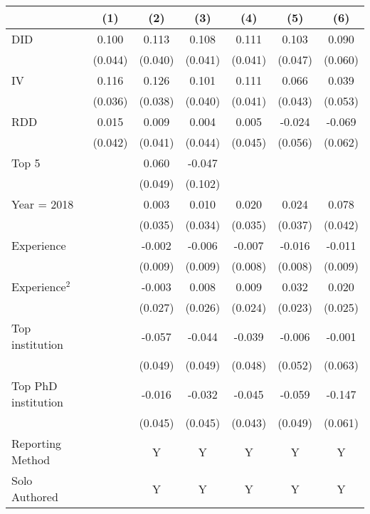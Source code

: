 \begin{tabular}{l*{6}{c}}
\hline\hline
                &\multicolumn{1}{c}{(1)}&\multicolumn{1}{c}{(2)}&\multicolumn{1}{c}{(3)}&\multicolumn{1}{c}{(4)}&\multicolumn{1}{c}{(5)}&\multicolumn{1}{c}{(6)}\\
\hline
DID             &    0.100&    0.113&    0.108&    0.111&    0.103&    0.090\\
                &  (0.044)&  (0.040)&  (0.041)&  (0.041)&  (0.047)&  (0.060)\\
IV              &    0.116&    0.126&    0.101&    0.111&    0.066&    0.039\\
                &  (0.036)&  (0.038)&  (0.040)&  (0.041)&  (0.043)&  (0.053)\\
RDD             &    0.015&    0.009&    0.004&    0.005&   -0.024&   -0.069\\
                &  (0.042)&  (0.041)&  (0.044)&  (0.045)&  (0.056)&  (0.062)\\
Top 5           &         &    0.060&   -0.047&         &         &         \\
                &         &  (0.049)&  (0.102)&         &         &         \\
Year = 2018     &         &    0.003&    0.010&    0.020&    0.024&    0.078\\
                &         &  (0.035)&  (0.034)&  (0.035)&  (0.037)&  (0.042)\\
Experience      &         &   -0.002&   -0.006&   -0.007&   -0.016&   -0.011\\
                &         &  (0.009)&  (0.009)&  (0.008)&  (0.008)&  (0.009)\\
Experience$^2$  &         &   -0.003&    0.008&    0.009&    0.032&    0.020\\
                &         &  (0.027)&  (0.026)&  (0.024)&  (0.023)&  (0.025)\\
Top institution &         &   -0.057&   -0.044&   -0.039&   -0.006&   -0.001\\
                &         &  (0.049)&  (0.049)&  (0.048)&  (0.052)&  (0.063)\\
Top PhD institution&         &   -0.016&   -0.032&   -0.045&   -0.059&   -0.147\\
                &         &  (0.045)&  (0.045)&  (0.043)&  (0.049)&  (0.061)\\
Reporting Method &         &        Y&        Y&        Y&        Y&        Y\\
Solo Authored   &         &        Y&        Y&        Y&        Y&        Y\\

\end{tabular}

